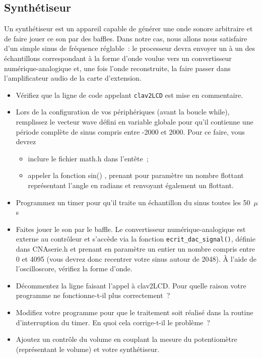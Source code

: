 \documentclass[11pt,a4paper]{article}
\theoremstyle{definition}%
\begin{document}
\subsection{Synthétiseur}
Un synthétiseur est un appareil capable de générer une onde sonore arbitraire et de faire jouer ce son par des baffles.
Dans notre cas, nous allons nous satisfaire d’un simple sinus de fréquence réglable~: le processeur devra envoyer un à un des échantillons correspondant à la forme d’onde voulue vers un convertisseur numérique-analogique et, une fois l’onde reconstruite, la faire passer dans l’amplificateur audio de la carte d’extension.
\begin{itemize}
	\item Vérifiez que la ligne de code appelant \texttt{clav2LCD} est mise en commentaire.
	\item Lors de la configuration de vos périphériques (avant la boucle while), remplissez le vecteur wave défini en variable globale pour qu’il contienne une période complète de sinus compris entre -2000 et 2000.
	Pour ce faire, vous devrez
	\begin{itemize}
		\item inclure le fichier math.h dans l’entête~;
		\item appeler la fonction sin() , prenant pour paramètre un nombre flottant représentant l’angle en radians et renvoyant également un flottant.
	\end{itemize}
	\item Programmez un timer pour qu’il traite un échantillon du sinus toutes les 50~$\mu$s
	\item Faites jouer le son par le baffle. Le convertisseur numérique-analogique est externe au contrôleur et s’accède via la fonction \texttt{ecrit\_dac\_signal()}, définie dans CNAserie.h et prenant en paramètre un entier un nombre compris entre 0 et 4095 (vous devrez donc recentrer votre sinus autour de 2048).
	À l’aide de l’oscilloscore, vérifiez la forme d’onde.
	\item Décommentez la ligne faisant l’appel à clav2LCD.
	Pour quelle raison votre programme ne fonctionne-t-il plus correctement~?
	\item Modifiez votre programme pour que le traitement soit réalisé dans la routine d’interruption du timer.
	En quoi cela corrige-t-il le problème~?
	\item Ajoutez un contrôle du volume en couplant la mesure du potentiomètre (représentant le volume) et votre synthétiseur.
\end{itemize}
\end{document}
